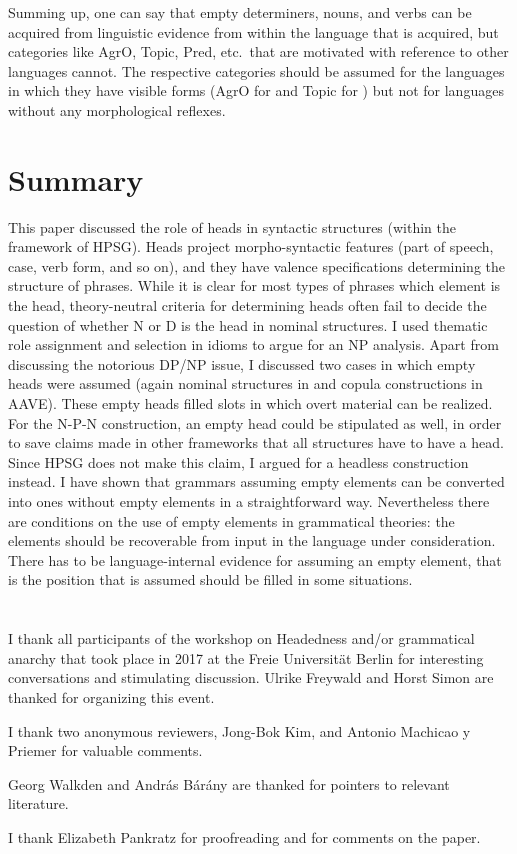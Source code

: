 \documentclass[output=paper
  ,nobabel
  ,draftmode
  ,uniformtopskip %
  ,colorlinks, citecolor=brown
]{langscibook}
\begin{document}
Summing up, one can say that empty determiners, nouns, and verbs can be acquired from linguistic
evidence from within the language that is acquired, but categories like
AgrO, Topic, Pred, etc.\ that are motivated with reference to other languages cannot. The respective
categories should be assumed for the languages in which they have visible forms (\eg AgrO for 
and Topic for ) but not for languages without any morphological reflexes.

\section{Summary}
\label{sec-summary}


This paper discussed the role of heads in syntactic structures (within the framework of HPSG). Heads
project morpho-syntactic features (part of speech, case, verb form, and so on), and they have valence
specifications determining the structure of phrases. While it is clear for most types of phrases
which element is the head, theory-neutral criteria for determining heads often fail to decide the
question of whether N or D is the head in  nominal structures. I used thematic role assignment
and selection in idioms to argue for an NP analysis. Apart from discussing the notorious DP/NP
issue, I discussed two cases in which empty heads were assumed (again nominal structures in  and copula
constructions in AAVE). These empty heads filled slots in which overt material can be realized. For
the N-P-N construction, an empty head could be stipulated as well, in order to save claims made in
other frameworks that all structures have to have a head. Since HPSG does not make this claim, I
argued for a headless construction instead. I have shown that grammars assuming empty elements can
be converted into ones without empty elements in a straightforward way. Nevertheless there are
conditions on the use of empty elements in grammatical theories: the elements should be recoverable
from input in the language under consideration. There has to be language-internal 
evidence for assuming an empty element, that is the position that is assumed should be filled in some
situations.


\section*{\acknowledgmentsUS}

I thank all participants of the workshop on Headedness and/or grammatical anarchy that took place in
2017 at the Freie Universität Berlin for interesting conversations and stimulating
discussion. Ulrike Freywald and Horst Simon are thanked for organizing this event.

I thank two anonymous reviewers, Jong-Bok Kim, and Antonio Machicao y Priemer for valuable comments.

Georg Walkden and András Bárány are thanked for pointers to relevant literature.

I thank Elizabeth Pankratz for proofreading and for comments on the paper.

{\sloppy
\printbibliography[heading=subbibliography,notkeyword=this]
}
\end{document}
